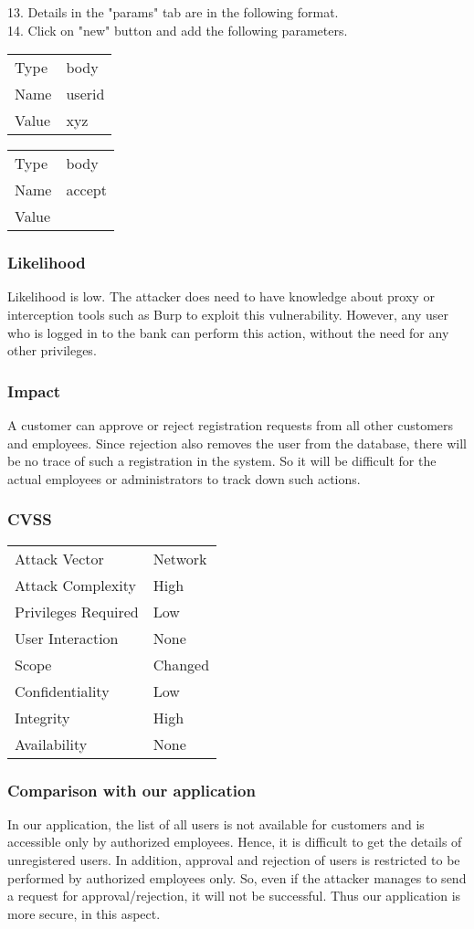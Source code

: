 13. Details in the "params" tab are in the following format. \\
14. Click on "new" button and add the following parameters. \\
\begin{tabular}{l | l}
Type		& body \\
Name		& userid \\
Value 		& xyz
\end{tabular}
\begin{tabular}{l | l}
Type		& body \\
Name		& accept \\
Value 		& 
\end{tabular}

\subsubsection{Likelihood}
Likelihood is low.
The attacker does need to have knowledge about proxy or interception tools such as Burp to exploit this vulnerability. However, any user who is logged in to the bank can perform this action, without the need for any other privileges.

\subsubsection{Impact}
A customer can approve or reject registration requests from all other customers and employees. Since rejection also removes the user from the database, there will be no trace of such a registration in the system. So it will be difficult for the actual employees or administrators to track down such actions.

\subsubsection{CVSS}
\begin{tabular}{l | l}
Attack Vector		& Network \\
Attack Complexity	& High \\
Privileges Required & Low \\
User Interaction	& None \\
Scope				& Changed \\
Confidentiality		& Low \\
Integrity			& High \\
Availability		& None
\end{tabular}

\subsubsection{Comparison with our application}
In our application, the list of all users is not available for customers and is accessible only by authorized employees. Hence, it is difficult to get the details of unregistered users. In addition, approval and rejection of users is restricted to be performed by authorized employees only. So, even if the attacker manages to send a request for approval/rejection, it will not be successful. Thus our application is more secure, in this aspect.
\clearpage